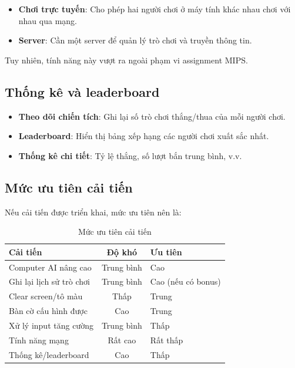 \begin{itemize}
    \item \textbf{Chơi trực tuyến}: Cho phép hai người chơi ở máy tính khác nhau chơi với nhau qua mạng.
    
    \item \textbf{Server}: Cần một server để quản lý trò chơi và truyền thông tin.
\end{itemize}

Tuy nhiên, tính năng này vượt ra ngoài phạm vi assignment MIPS.

\subsection{Thống kê và leaderboard}

\begin{itemize}
    \item \textbf{Theo dõi chiến tích}: Ghi lại số trò chơi thắng/thua của mỗi người chơi.
    
    \item \textbf{Leaderboard}: Hiển thị bảng xếp hạng các người chơi xuất sắc nhất.
    
    \item \textbf{Thống kê chi tiết}: Tỷ lệ thắng, số lượt bắn trung bình, v.v.
\end{itemize}

\subsection{Mức ưu tiên cải tiến}

Nếu cải tiến được triển khai, mức ưu tiên nên là:

\begin{table}[H]
\centering
\begin{tabular}{|l|c|l|}
\hline
\textbf{Cải tiến} & \textbf{Độ khó} & \textbf{Ưu tiên} \\
\hline
Computer AI nâng cao & Trung bình & Cao \\
\hline
Ghi lại lịch sử trò chơi & Trung bình & Cao (nếu có bonus) \\
\hline
Clear screen/tô màu & Thấp & Trung \\
\hline
Bàn cờ cấu hình được & Cao & Trung \\
\hline
Xử lý input tăng cường & Trung bình & Thấp \\
\hline
Tính năng mạng & Rất cao & Rất thấp \\
\hline
Thống kê/leaderboard & Cao & Thấp \\
\hline
\end{tabular}
\caption{Mức ưu tiên cải tiến}
\end{table}

